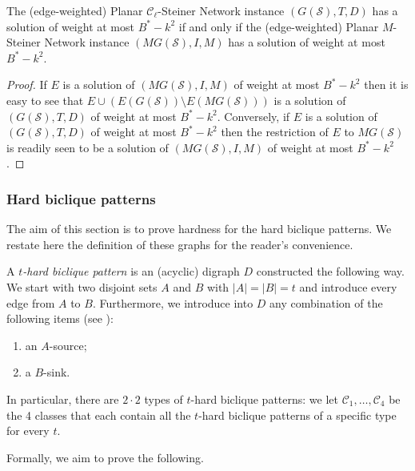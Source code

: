 \begin{lemma}
The (edge-weighted) {\sc Planar $\mathcal{C}_\ell$-Steiner Network} instance $(G(\mathcal{S}),T,D)$ has a solution of weight at most $B^*-k^2$ if and only if the (edge-weighted) {\sc Planar $M$-Steiner Network} instance $(MG(\mathcal{S}),I,M)$ has a solution of weight at most $B^*-k^2$.
\end{lemma}

\begin{proof}
If $E$ is a solution of $(MG(\mathcal{S}),I,M)$ of weight at most $B^*-k^2$ then it is easy to see that $E \cup (E(G(\mathcal{S})) \setminus E(MG(\mathcal{S})))$ is a solution of $(G(\mathcal{S}),T,D)$ of weight at most $B^*-k^2$.
Conversely, if $E$ is a solution of $(G(\mathcal{S}),T,D)$ of weight at most $B^*-k^2$ then the restriction of $E$ to $MG(\mathcal{S})$ is readily seen to be a solution of $(MG(\mathcal{S}),I,M)$ of weight at most $B^*-k^2$.
\end{proof}

\subsubsection{Hard biclique patterns}
\label{sec:biclique}

The aim of this section is to prove hardness for the hard biclique patterns. We restate here the definition of these graphs for the reader's convenience.

\begingroup
\def\thetheorem{\ref{def:cleanedbiclique}}
\begin{definition}
A \emph{$t$-hard biclique pattern} is an (acyclic) digraph $D$ constructed the following way. We start with two disjoint sets $A$ and $B$ with  $|A| = |B| = t$ and introduce every edge from $A$ to $B$. Furthermore, we introduce into $D$ any combination of the following items (see ):
\begin{enumerate}
\item an $A$-source;
\item a $B$-sink.
\end{enumerate}
In particular, there are $2 \cdot 2$ types of $t$-hard biclique patterns: we let $\mathcal{C}_1,\ldots,\mathcal{C}_4$ be the 4 classes that each contain all the $t$-hard biclique patterns of a specific type for every $t$.
\end{definition}
\addtocounter{theorem}{-1}
\endgroup

Formally, we aim to prove the following.

